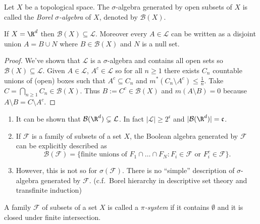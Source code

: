 \documentclass[a4paper]{article}
\begin{document}
\begin{definition}
  Let \(X\) be a topological space. The \(\sigma\)-algebra generated by open subsets of \(X\) is called the \emph{Borel \(\sigma\)-algebra} of \(X\), denoted by \(\mathcal B(X)\).
\end{definition}

\begin{proposition}
  If \(X = \R^d\) then \(\mathcal B(X) \subseteq \mathcal L\). Moreover every \(A \in \mathcal L\) can be written as a disjoint union \(A = B \cup N\) where \(B \in \mathcal B(X)\) and \(N\) is a null set.
\end{proposition}


\begin{proof}
  We've shown that \(\mathcal L\) is a \(\sigma\)-algebra and contains all open sets so \(\mathcal B(X) \subseteq \mathcal L\). Given \(A \in \mathcal L\), \(A^c \in \mathcal L\) so for all \(n \geq 1\) there exists \(C_n\) countable unions of (open) boxes such that \(A^c \subseteq C_n\) and \(m^*(C_n \setminus A^c) \leq \frac{1}{n}\). Take \(C = \bigcap_{n \geq 1} C_n \in \mathcal B(X)\). Thus \(B := C^c \in \mathcal B(X)\) and \(m(A \setminus B) = 0\) because \(A \setminus B = C \setminus A^c\).
\end{proof}

\begin{remark}\leavevmode
  \begin{enumerate}
  \item It can be shown that \(\mathcal B(\R^d) \subsetneq \mathcal L\). In fact \(|\mathcal L| \geq 2^{\mathfrak c}\) and \(|\mathcal B(\R^d)| = \mathfrak c\).
  \item If \(\mathcal F\) is a family of subsets of a set \(X\), the Boolean algebra generated by \(\mathcal F\) can be explicitly described as
    \[
      \mathcal B(\mathcal F) = \{\text{finite unions of } F_1 \cap \dots \cap F_N: F_i \in \mathcal F \text{ or } F_i^c \in \mathcal F\}.
    \]
  \item However, this is not so for \(\sigma(\mathcal F)\). There is no ``simple'' description of \(\sigma\)-algebra generated by \(\mathcal F\). (c.f.\ Borel hierarchy in descriptive set theory and transfinite induction)
  \end{enumerate}
\end{remark}

\begin{definition}[\(\pi\)-system]
  A family \(\mathcal F\) of subsets of a set \(X\) is called a \emph{\(\pi\)-system} if it contains \(\emptyset\) and it is closed under finite intersection.
\end{definition}
\end{document}
